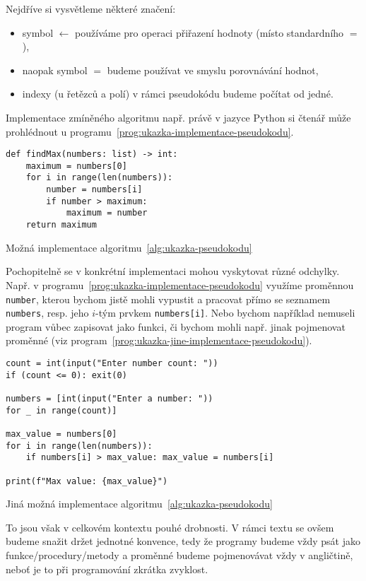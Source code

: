 Nejdříve si vysvětleme některé značení:
\begin{itemize}
    \item symbol $\gets$ používáme pro operaci přiřazení hodnoty (místo standardního $=$),
    \item naopak symbol $=$ budeme používat ve smyslu porovnávání hodnot,
    \item indexy (u řetězců a polí) v rámci pseudokódu budeme počítat od jedné.
\end{itemize}
Implementace zmíněného algoritmu např. právě v jazyce Python si čtenář může prohlédnout u programu~\ref{prog:ukazka-implementace-pseudokodu}.
\begin{program}[h]
\begin{lstlisting}[style=python]
def findMax(numbers: list) -> int:
    maximum = numbers[0]
    for i in range(len(numbers)):
        number = numbers[i]
        if number > maximum:
            maximum = number
    return maximum
\end{lstlisting}
    \caption{Možná implementace algoritmu~\ref{alg:ukazka-pseudokodu}}
    \label{prog:ukazka-implementace-pseudokodu}
\end{program}
Pochopitelně se v konkrétní implementaci mohou vyskytovat různé odchylky. Např. v programu~\ref{prog:ukazka-implementace-pseudokodu} využíme proměnnou \texttt{number}, kterou bychom jistě mohli vypustit a pracovat přímo se seznamem \texttt{numbers}, resp. jeho $i$-tým prvkem \texttt{numbers[i]}. Nebo bychom například nemuseli program vůbec zapisovat jako funkci, či bychom mohli např. jinak pojmenovat proměnné (viz program~\ref{prog:ukazka-jine-implementace-pseudokodu}).
\begin{program}[h]
\begin{lstlisting}[style=python]
count = int(input("Enter number count: "))
if (count <= 0): exit(0)

numbers = [int(input("Enter a number: "))
for _ in range(count)]

max_value = numbers[0]
for i in range(len(numbers)):
    if numbers[i] > max_value: max_value = numbers[i]

print(f"Max value: {max_value}")
\end{lstlisting}
    \caption{Jiná možná implementace algoritmu~\ref{alg:ukazka-pseudokodu}}
    \label{prog:ukazka-jine-implementace-pseudokodu}
    \end{program}
To jsou však v celkovém kontextu pouhé drobnosti. V rámci textu se ovšem budeme snažit držet jednotné konvence, tedy že programy budeme vždy psát jako funkce/procedury/metody a proměnné budeme pojmenovávat vždy v angličtině, neboť je to při programování zkrátka zvyklost.
